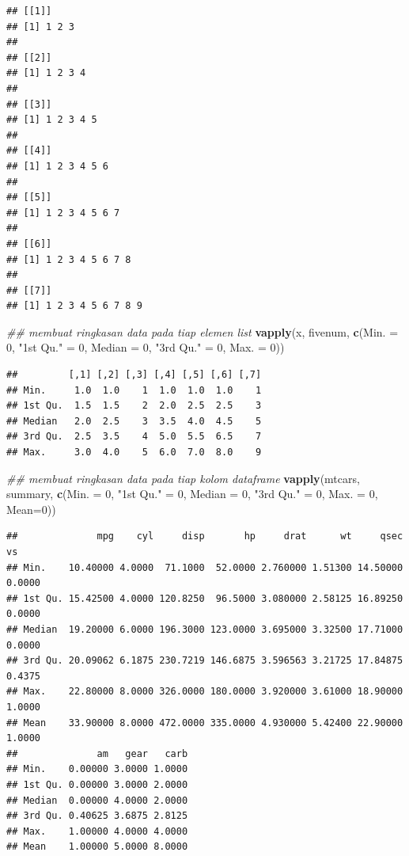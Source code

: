 \documentclass[]{book}
\newenvironment{Shaded}{\begin{snugshade}}{\end{snugshade}}
\newcommand{\CommentTok}[1]{\textcolor[rgb]{0.56,0.35,0.01}{\textit{#1}}}
\newcommand{\DataTypeTok}[1]{\textcolor[rgb]{0.13,0.29,0.53}{#1}}
\newcommand{\DecValTok}[1]{\textcolor[rgb]{0.00,0.00,0.81}{#1}}
\newcommand{\KeywordTok}[1]{\textcolor[rgb]{0.13,0.29,0.53}{\textbf{#1}}}
\newcommand{\NormalTok}[1]{#1}
\newcommand{\StringTok}[1]{\textcolor[rgb]{0.31,0.60,0.02}{#1}}
\theoremstyle{definition}
\theoremstyle{definition}
\theoremstyle{definition}
\theoremstyle{remark}
\begin{document}
\begin{verbatim}
## [[1]]
## [1] 1 2 3
## 
## [[2]]
## [1] 1 2 3 4
## 
## [[3]]
## [1] 1 2 3 4 5
## 
## [[4]]
## [1] 1 2 3 4 5 6
## 
## [[5]]
## [1] 1 2 3 4 5 6 7
## 
## [[6]]
## [1] 1 2 3 4 5 6 7 8
## 
## [[7]]
## [1] 1 2 3 4 5 6 7 8 9
\end{verbatim}

\begin{Shaded}
\begin{Highlighting}[]
\CommentTok{## membuat ringkasan data pada tiap elemen list}
\KeywordTok{vapply}\NormalTok{(x, fivenum,}
       \KeywordTok{c}\NormalTok{(}\DataTypeTok{Min. =} \DecValTok{0}\NormalTok{, }\StringTok{"1st Qu."}\NormalTok{ =}\StringTok{ }\DecValTok{0}\NormalTok{, }
         \DataTypeTok{Median =} \DecValTok{0}\NormalTok{, }\StringTok{"3rd Qu."}\NormalTok{ =}\StringTok{ }\DecValTok{0}\NormalTok{, }\DataTypeTok{Max. =} \DecValTok{0}\NormalTok{))}
\end{Highlighting}
\end{Shaded}

\begin{verbatim}
##         [,1] [,2] [,3] [,4] [,5] [,6] [,7]
## Min.     1.0  1.0    1  1.0  1.0  1.0    1
## 1st Qu.  1.5  1.5    2  2.0  2.5  2.5    3
## Median   2.0  2.5    3  3.5  4.0  4.5    5
## 3rd Qu.  2.5  3.5    4  5.0  5.5  6.5    7
## Max.     3.0  4.0    5  6.0  7.0  8.0    9
\end{verbatim}

\begin{Shaded}
\begin{Highlighting}[]
\CommentTok{## membuat ringkasan data pada tiap kolom dataframe}
\KeywordTok{vapply}\NormalTok{(mtcars, summary,}
       \KeywordTok{c}\NormalTok{(}\DataTypeTok{Min. =} \DecValTok{0}\NormalTok{, }\StringTok{"1st Qu."}\NormalTok{ =}\StringTok{ }\DecValTok{0}\NormalTok{, }
         \DataTypeTok{Median =} \DecValTok{0}\NormalTok{, }\StringTok{"3rd Qu."}\NormalTok{ =}\StringTok{ }\DecValTok{0}\NormalTok{, }\DataTypeTok{Max. =} \DecValTok{0}\NormalTok{, }\DataTypeTok{Mean=}\DecValTok{0}\NormalTok{))}
\end{Highlighting}
\end{Shaded}

\begin{verbatim}
##              mpg    cyl     disp       hp     drat      wt     qsec     vs
## Min.    10.40000 4.0000  71.1000  52.0000 2.760000 1.51300 14.50000 0.0000
## 1st Qu. 15.42500 4.0000 120.8250  96.5000 3.080000 2.58125 16.89250 0.0000
## Median  19.20000 6.0000 196.3000 123.0000 3.695000 3.32500 17.71000 0.0000
## 3rd Qu. 20.09062 6.1875 230.7219 146.6875 3.596563 3.21725 17.84875 0.4375
## Max.    22.80000 8.0000 326.0000 180.0000 3.920000 3.61000 18.90000 1.0000
## Mean    33.90000 8.0000 472.0000 335.0000 4.930000 5.42400 22.90000 1.0000
##              am   gear   carb
## Min.    0.00000 3.0000 1.0000
## 1st Qu. 0.00000 3.0000 2.0000
## Median  0.00000 4.0000 2.0000
## 3rd Qu. 0.40625 3.6875 2.8125
## Max.    1.00000 4.0000 4.0000
## Mean    1.00000 5.0000 8.0000
\end{verbatim}
\end{document}
